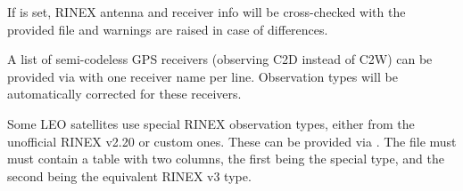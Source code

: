 If  is set, RINEX antenna and receiver info
will be cross-checked with the provided file and warnings are raised in case of differences.

A list of semi-codeless GPS receivers (observing C2D instead of C2W) can be provided via
 with one receiver name per line.
Observation types will be automatically corrected for these receivers.

Some LEO satellites use special RINEX observation types, either from the unofficial RINEX v2.20
or custom ones. These can be provided via .
The file must  must contain a table with two columns, the first being the special type,
and the second being the equivalent RINEX v3 type.




